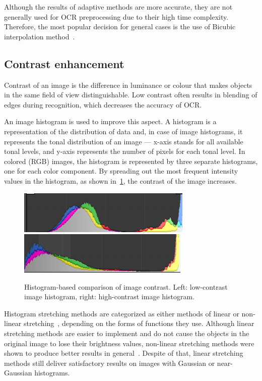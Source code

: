 Although the results of adaptive methods are more accurate, they are not generally used for OCR preprocessing due to their high time complexity. Therefore, the most popular decision for general cases is the use of Bicubic interpolation method~\cite{interpolationComp}.

\subsection{Contrast enhancement} \label{contrastEnhancemet}

Contrast of an image is the difference in luminance or colour that makes objects in the same field of view distinguishable. Low contrast often results in blending of edges during recognition, which decreases the accuracy of OCR.

An image histogram is used to improve this aspect. A histogram is a representation of the distribution of data and, in case of image histograms, it represents the tonal distribution of an image --- x-axis stands for all available tonal levels, and y-axis represents the number of pixels for each tonal level. In colored (RGB) images, the histogram is represented by three separate histograms, one for each color component. By spreading out the most frequent intensity values in the histogram, as shown in~\cref{fig:preprocessContrastComparison}, the contrast of the image increases.

\begin{figure}[t]
\centering
\includegraphics[width=0.4\linewidth]{img/preprocessing//histogram_low.png}
\qquad
\includegraphics[width=0.4\linewidth]{img/preprocessing/histogram_high.png}
\caption{Histogram-based comparison of image contrast. Left: low-contrast image histogram, right: high-contrast image histogram.}
\label{fig:preprocessContrastComparison}
\end{figure}

Histogram stretching methods are categorized as either methods of linear or non-linear stretching~\citep{linearNonStretch}, depending on the forms of functions they use. Although linear stretching methods are easier to implement and do not cause the objects in the original image to lose their brightness values, non-linear stretching methods were shown to produce better results in general~\citep{chandpa1comparative}. Despite of that, linear stretching methods still deliver satisfactory results on images with Gaussian or near-Gaussian histograms.

